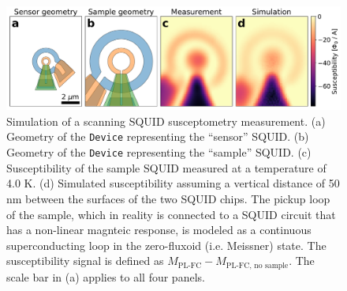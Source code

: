 \documentclass[final,3p,times,twocolumn]{elsarticle}
\newcommand{\inline}[1]{\texttt{#1}\xspace}
\newcommand{\nm}{\mathrm{nm}}
\begin{document}

\begin{figure}
    \centering
    \includegraphics[width=\linewidth]{examples/images/squid-susc-simulation.pdf}
    \caption{Simulation of a scanning SQUID susceptometry measurement. (a) Geometry of the \inline{Device} representing the ``sensor'' SQUID. (b) Geometry of the \inline{Device} representing the ``sample'' SQUID. (c) Susceptibility of the sample SQUID measured at a temperature of 4.0 K. (d) Simulated susceptibility assuming a vertical distance of 50 nm between the surfaces of the two SQUID chips. The pickup loop of the sample, which in reality is connected to a SQUID circuit that has a non-linear magnteic response, is modeled as a continuous superconducting loop in the zero-fluxoid (i.e. Meissner) state. The susceptibility signal is defined as $M_\text{PL-FC} - M_\text{PL-FC, no sample}$. The scale bar in (a) applies to all four panels.}
    \label{fig:squid-susc}
\end{figure}
\end{document}
